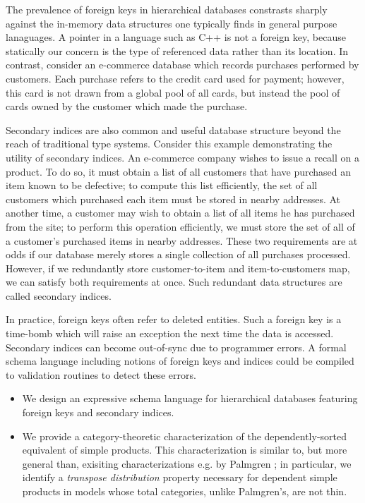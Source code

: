 \documentclass[sigplan,10pt,review,anonymous]{acmart}
\begin{document}
The prevalence of foreign keys in hierarchical databases constrasts sharply against the in-memory data structures one typically finds in general purpose lanaguages. A pointer in a language such as C++ is not a foreign key, because statically our concern is the type of referenced data rather than its location. In contrast, consider an e-commerce database which records purchases performed by customers. Each purchase refers to the credit card used for payment; however, this card is not drawn from a global pool of all cards, but instead the pool of cards owned by the customer which made the purchase. 

Secondary indices are also common and useful database structure beyond the reach of traditional type systems. Consider this example demonstrating the utility of secondary indices. An e-commerce company wishes to issue a recall on a product. To do so, it must obtain a list of all customers that have purchased an item known to be defective; to compute this list efficiently, the set of all customers which purchased each item must be stored in nearby addresses. At another time, a customer may wish to obtain a list of all items he has purchased from the site; to perform this operation efficiently, we must store the set of all of a customer's purchased items in nearby addresses. These two requirements are at odds if our database merely stores a single collection of all purchases processed. However, if we redundantly store customer-to-item and item-to-customers map, we can satisfy both requirements at once. Such redundant data structures are called secondary indices.

In practice, foreign keys often refer to deleted entities. Such a foreign key is a time-bomb which will raise an exception the next time the data is accessed. Secondary indices can become out-of-sync due to programmer errors. A formal schema language including notions of foreign keys and indices could be compiled to validation routines to detect these errors. 
\begin{itemize}   
\item We design an expressive schema language for hierarchical databases featuring foreign keys and secondary indices. 
\item We provide a category-theoretic characterization of the dependently-sorted equivalent of simple products. This characterization is similar to, but more general than, exisiting characterizations e.g. by Palmgren \cite{palmgren2019categories}; in particular, we identify a \emph{transpose distribution} property necessary for dependent simple products in models whose total categories, unlike Palmgren's, are not thin.

\end{itemize}
\end{document}
